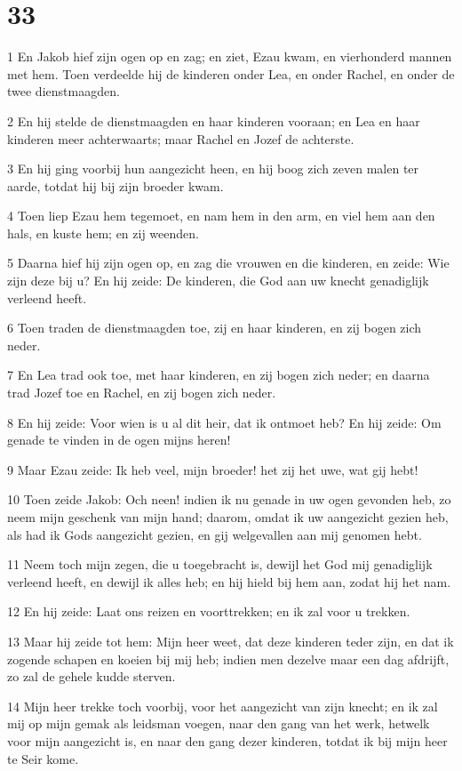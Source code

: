 \chapter{33}

\par 1 En Jakob hief zijn ogen op en zag; en ziet, Ezau kwam, en vierhonderd mannen met hem. Toen verdeelde hij de kinderen onder Lea, en onder Rachel, en onder de twee dienstmaagden.
\par 2 En hij stelde de dienstmaagden en haar kinderen vooraan; en Lea en haar kinderen meer achterwaarts; maar Rachel en Jozef de achterste.
\par 3 En hij ging voorbij hun aangezicht heen, en hij boog zich zeven malen ter aarde, totdat hij bij zijn broeder kwam.
\par 4 Toen liep Ezau hem tegemoet, en nam hem in den arm, en viel hem aan den hals, en kuste hem; en zij weenden.
\par 5 Daarna hief hij zijn ogen op, en zag die vrouwen en die kinderen, en zeide: Wie zijn deze bij u? En hij zeide: De kinderen, die God aan uw knecht genadiglijk verleend heeft.
\par 6 Toen traden de dienstmaagden toe, zij en haar kinderen, en zij bogen zich neder.
\par 7 En Lea trad ook toe, met haar kinderen, en zij bogen zich neder; en daarna trad Jozef toe en Rachel, en zij bogen zich neder.
\par 8 En hij zeide: Voor wien is u al dit heir, dat ik ontmoet heb? En hij zeide: Om genade te vinden in de ogen mijns heren!
\par 9 Maar Ezau zeide: Ik heb veel, mijn broeder! het zij het uwe, wat gij hebt!
\par 10 Toen zeide Jakob: Och neen! indien ik nu genade in uw ogen gevonden heb, zo neem mijn geschenk van mijn hand; daarom, omdat ik uw aangezicht gezien heb, als had ik Gods aangezicht gezien, en gij welgevallen aan mij genomen hebt.
\par 11 Neem toch mijn zegen, die u toegebracht is, dewijl het God mij genadiglijk verleend heeft, en dewijl ik alles heb; en hij hield bij hem aan, zodat hij het nam.
\par 12 En hij zeide: Laat ons reizen en voorttrekken; en ik zal voor u trekken.
\par 13 Maar hij zeide tot hem: Mijn heer weet, dat deze kinderen teder zijn, en dat ik zogende schapen en koeien bij mij heb; indien men dezelve maar een dag afdrijft, zo zal de gehele kudde sterven.
\par 14 Mijn heer trekke toch voorbij, voor het aangezicht van zijn knecht; en ik zal mij op mijn gemak als leidsman voegen, naar den gang van het werk, hetwelk voor mijn aangezicht is, en naar den gang dezer kinderen, totdat ik bij mijn heer te Seir kome.
